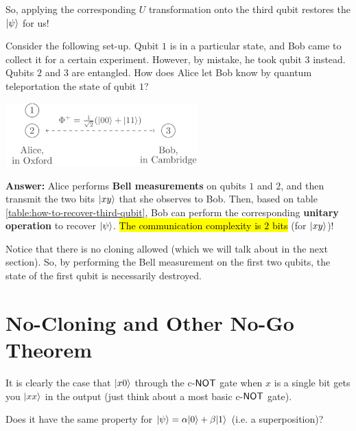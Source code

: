 \documentclass[12pt]{article}
\begin{document}
\noindent So, applying the corresponding $U$ transformation onto the third qubit restores the $\Ket{\psi}$ for us!

\begin{example}
Consider the following set-up. Qubit $1$ is in a particular state, and Bob came to collect it for a certain experiment. However, by mistake, he took qubit $3$ instead. Qubits $2$ and $3$ are entangled. How does Alice let Bob know by quantum teleportation the state of qubit $1$?
\begin{center}
    \includegraphics[width = 20em]{images/6.jpg}
\end{center}

\noindent \textbf{Answer:} Alice performs \textbf{Bell measurements} on qubits $1$ and $2$, and then transmit the two bits $\Ket{xy}$ that she observes to Bob. Then, based on table \ref{table:how-to-recover-third-qubit}, Bob can perform the corresponding \textbf{unitary operation} to recover $\Ket{\psi}$. \hl{The communication complexity is $2$ bits} (for $\Ket{xy}$)!
\end{example}

\begin{remark}
Notice that there is no cloning allowed (which we will talk about in the next section). So, by performing the Bell measurement on the first two qubits, the state of the first qubit is necessarily destroyed.
\end{remark}

\section{No-Cloning and Other No-Go Theorem}
It is clearly the case that $\Ket{x0}$ through the c-$\NOT$ gate when $x$ is a single bit gets you $\Ket{xx}$ in the output (just think about a most basic c-$\NOT$ gate).

\noindent Does it have the same property for $\Ket{\psi} = \alpha \Ket{0} + \beta\Ket{1}$ (i.e. a superposition)?
\end{document}
